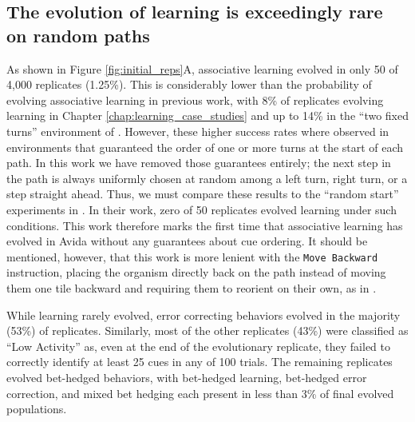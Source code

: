 \subsection{The evolution of learning is exceedingly rare on random paths}

As shown in Figure \ref{fig:initial_reps}A, associative learning evolved in only 50 of 4,000 replicates (1.25\%). 
This is considerably lower than the probability of evolving associative learning in previous work, with 8\% of replicates evolving learning in Chapter \ref{chap:learning_case_studies} and up to 14\% in the ``two fixed turns'' environment of \citep{pontesEvolutionaryOriginAssociative2020}.
However, these higher success rates where observed in environments that guaranteed the order of one or more turns at the start of each path. 
In this work we have removed those guarantees entirely; the next step in the path is always uniformly chosen at random among a left turn, right turn, or a step straight ahead.
Thus, we must compare these results to the ``random start'' experiments in 
\citep{pontesEvolutionaryOriginAssociative2020}. 
In their work, zero of 50 replicates evolved learning under such conditions. 
This work therefore marks the first time that associative learning has evolved in Avida without any guarantees about cue ordering. 
It should be mentioned, however, that this work is more lenient with the \texttt{Move Backward} instruction, placing the organism directly back on the path instead of moving them one tile backward and requiring them to reorient on their own, as in \citep{pontesEvolutionaryOriginAssociative2020}.

While learning rarely evolved, error correcting behaviors evolved in the majority (53\%) of replicates. 
Similarly, most of the other replicates (43\%) were classified as ``Low Activity'' as, even at the end of the evolutionary replicate, they failed to correctly identify at least 25 cues in any of 100 trials. 
The remaining replicates evolved bet-hedged behaviors, with bet-hedged learning, bet-hedged error correction, and mixed bet hedging each present in less than 3\% of final evolved populations.

